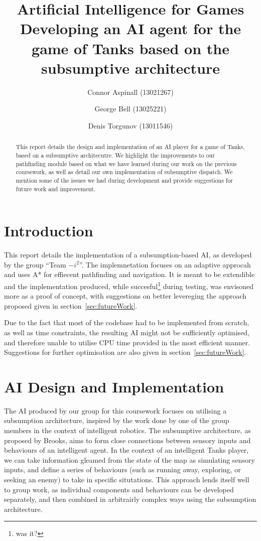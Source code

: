 \documentclass[11pt]{article}
\title{Artificial Intelligence for Games\\
Developing an AI agent for the game of Tanks based on the subsumptive architecture}
\author{Connor Aspinall (13021267) \and George Bell (13025221) \and Denis Torgunov (13011546)}
\date{}
\begin{document}
\maketitle
\begin{abstract}
  This report details the design and implementation of an AI player for a game of Tanks, based on a subsumptive architecutre. We highlight the improvements to our pathfinding module based on what we have learned during our work on the previous coursework, as well as detail our own implementation of subsumptive dispatch. We mention some of the issues we had during development and provide suggestions for future work and improvement.
\end{abstract}
\tableofcontents
\thispagestyle{empty}

\newpage

\section{Introduction}
This report details the implementation of a subsumption-based AI, as developed by the group ``Team \(-i^2\)''. The implemnetation focuses on an adaptive approcah and uses A* for effiecent pathfinding and navigation. It is meant to be extendible and the implementation produced, while succesful\footnote{was it?} during testing, was envisoned more as a proof of concept, with suggestions on better levereging the approach proposed given in section~\ref{sec:futureWork}.

Due to the fact that most of the codebase had to be implemented from scratch, as well as time constraints, the resulting AI might not be sufficiently optimised, and therefore unable to utilise CPU time provided in the most efficient manner. Suggestions for further optimisation are also given in section~\ref{sec:futureWork}.

\section{AI Design and Implementation} \label{sec:design}

The AI produced by our group for this coursework focuses on utilising a subsumption architecture, inspired by the work done by one of the group members in the context of intelligent robotics. The subsumptive architecture, as proposed by Brooks, aims to form close connections between sensory inputs and behaviours of an intelligent agent\cite{brooks1}. In the context of an intelligent Tanks player, we can take information gleamed from the state of the map as simulating sensory inputs, and define a series of behaviours (such as running away, exploring, or seeking an enemy) to take in specific situtations. This approach lends itself well to group work, as individual components and behaviours can be developed separately, and then combined in arbitrairly complex ways using the subsumption architecture.
\end{document}
